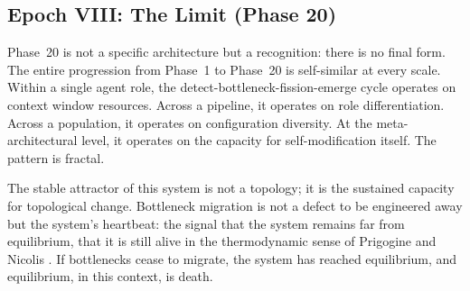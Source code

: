 \subsection{Epoch VIII: The Limit (Phase 20)}

Phase~20 is not a specific architecture but a recognition: there is no final form. The entire progression from Phase~1 to Phase~20 is self-similar at every scale. Within a single agent role, the detect-bottleneck-fission-emerge cycle operates on context window resources. Across a pipeline, it operates on role differentiation. Across a population, it operates on configuration diversity. At the meta-architectural level, it operates on the capacity for self-modification itself. The pattern is fractal.

The stable attractor of this system is not a topology; it is the sustained capacity for topological change. Bottleneck migration is not a defect to be engineered away but the system's heartbeat: the signal that the system remains far from equilibrium, that it is still alive in the thermodynamic sense of Prigogine and Nicolis \cite{prigogine1977}. If bottlenecks cease to migrate, the system has reached equilibrium, and equilibrium, in this context, is death.
